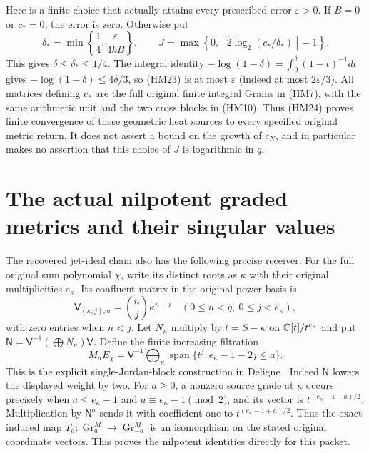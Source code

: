 \documentclass[11pt]{article}
\begin{document}
Here is a finite choice that actually attains every prescribed error
$\varepsilon>0$. If $B=0$ or $c_*=0$, the error is zero. Otherwise put
\begin{equation}\tag{HM24}
 \delta_* =\min\left\{\frac14,\frac{\varepsilon}{4kB}\right\},\qquad
 J=\max\left\{0,
       \left\lceil2\log_2(c_*/\delta_*)\right\rceil-1\right\}.
\end{equation}
This gives $\delta\le\delta_*\le1/4$. The integral identity
$-\log(1-\delta)=\int_0^\delta(1-t)^{-1}dt$
gives $-\log(1-\delta)\le4\delta/3$, so (HM23) is at most
$\varepsilon$ (indeed at most $2\varepsilon/3$). All matrices defining
$c_*$ are the full original finite integral Grams in (HM7), with the
same arithmetic unit and the two cross blocks in (HM10).
Thus (HM24) proves finite convergence of these geometric heat sources to
every specified original metric return. It does not assert a bound on
the growth of $c_N$, and in particular makes no assertion that this
choice of $J$ is logarithmic in $q$.

\section{The actual nilpotent graded metrics and their singular values}
The recovered jet-ideal chain also has the following precise receiver.
For the full original sum polynomial $\chi$, write its distinct roots as
$\kappa$ with their original multiplicities $e_\kappa$. Its confluent
matrix in the original power basis is
\[
 \mathsf V_{(\kappa,j),n}=\binom nj\kappa^{n-j}
 \quad(0\le n<q,\ 0\le j<e_\kappa),
\]
with zero entries when $n<j$. Let $N_\kappa$ multiply by $t=S-\kappa$
on $\mathbb C[t]/t^{e_\kappa}$ and put
$\mathsf N=\mathsf V^{-1}(\bigoplus N_\kappa)\mathsf V$.
Define the finite increasing filtration
\begin{equation}\tag{HM25}
 M_aE_\chi=\mathsf V^{-1}\bigoplus_\kappa
 \operatorname{span}\{t^j:e_\kappa-1-2j\le a\}.
\end{equation}
This is the explicit single-Jordan-block construction in
Deligne \cite[(1.6.1), (1.6.7)]{hm2:Deligne}. Indeed $\mathsf N$ lowers
the displayed weight by two. For $a\ge0$, a nonzero source grade at
$\kappa$ occurs precisely when $a\le e_\kappa-1$ and
$a\equiv e_\kappa-1\pmod2$, and its vector is
$t^{(e_\kappa-1-a)/2}$. Multiplication by $\mathsf N^a$ sends it
with coefficient one to $t^{(e_\kappa-1+a)/2}$. Thus the exact induced
map $T_a:\operatorname{Gr}_a^M\to\operatorname{Gr}_{-a}^M$ is an
isomorphism on the stated original coordinate vectors. This proves
the nilpotent identities directly for this packet.
\end{document}
